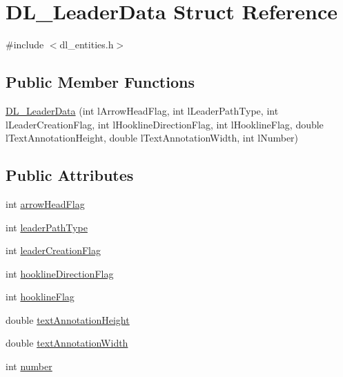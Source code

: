 \hypertarget{structDL__LeaderData}{\section{D\-L\-\_\-\-Leader\-Data Struct Reference}
\label{structDL__LeaderData}
}


{\ttfamily \#include $<$dl\-\_\-entities.\-h$>$}

\subsection*{Public Member Functions}
\begin{DoxyCompactItemize}
\item 
\hyperlink{structDL__LeaderData_a4dc0aa8fcc28e9d0138b7de9ac34c90d}{D\-L\-\_\-\-Leader\-Data} (int l\-Arrow\-Head\-Flag, int l\-Leader\-Path\-Type, int l\-Leader\-Creation\-Flag, int l\-Hookline\-Direction\-Flag, int l\-Hookline\-Flag, double l\-Text\-Annotation\-Height, double l\-Text\-Annotation\-Width, int l\-Number)
\end{DoxyCompactItemize}
\subsection*{Public Attributes}
\begin{DoxyCompactItemize}
\item 
int \hyperlink{structDL__LeaderData_a5d4fb290c3a9aa9f97a621be2e532a06}{arrow\-Head\-Flag}
\item 
int \hyperlink{structDL__LeaderData_a15f9bd64a8e0798c80466edc9d8342df}{leader\-Path\-Type}
\item 
int \hyperlink{structDL__LeaderData_afb482d86407e03f98cdae3e01c180ec3}{leader\-Creation\-Flag}
\item 
int \hyperlink{structDL__LeaderData_aa7eb530ff33b3ee9c0b94a386240cd62}{hookline\-Direction\-Flag}
\item 
int \hyperlink{structDL__LeaderData_ad5704cf436904a0c22843c35fbe1f65b}{hookline\-Flag}
\item 
double \hyperlink{structDL__LeaderData_a9d37c08e1ca3b03059006a126ab55103}{text\-Annotation\-Height}
\item 
double \hyperlink{structDL__LeaderData_ad5f09431f77788116475bd5ec83ce6ba}{text\-Annotation\-Width}
\item 
int \hyperlink{structDL__LeaderData_a5566b3ed80917edc0fe31fb01e2de95e}{number}
\end{DoxyCompactItemize}


